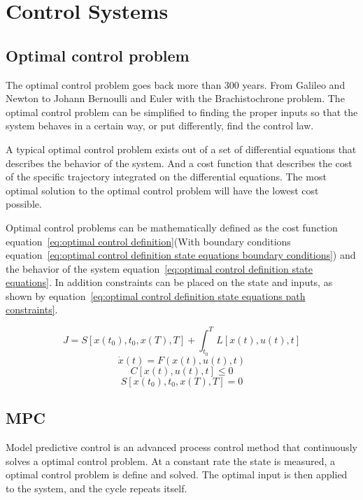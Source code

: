 \chapter{Control Systems}
\section{Optimal control problem}
	The optimal control problem goes back more than 300 years. From Galileo and Newton to Johann Bernoulli and Euler with the Brachistochrone problem. The optimal control problem can be simplified to finding the proper inputs so that the system behaves in a certain way, or put differently, find the control law.
	
	A typical optimal control problem exists out of a set of differential equations that describes the behavior of the system. And a cost function that describes the cost of the specific trajectory integrated on the differential equations. The most optimal solution to the optimal control problem will have the lowest cost possible.
	
	Optimal control problems can be mathematically defined as the cost function equation~\ref{eq:optimal control definition}(With boundary conditions equation~\ref{eq:optimal control definition state equations boundary conditions})  and the behavior of the system equation~\ref{eq:optimal control definition state equations}. In addition constraints can be placed on the state and inputs, as shown by equation~\ref{eq:optimal control definition state equations path constraints}. 
	
	\begin{equation}
		J = S[x(t_0),t_0,x(T),T] + \int_{t_0}^{T} L[x(t),u(t),t]
		\label{eq:optimal control definition}
	\end{equation}
	\begin{equation}
		\dot{x}(t) = F(x(t),u(t),t)
		\label{eq:optimal control definition state equations}
	\end{equation}
	\begin{equation}
		C[x(t),u(t),t]\le 0
		\label{eq:optimal control definition state equations path constraints}
	\end{equation}
	\begin{equation}
		S[x(t_0),t_0,x(T),T]=0
		\label{eq:optimal control definition state equations boundary conditions}
	\end{equation}

\section{MPC}
	Model predictive control is an advanced process control method that continuously solves a  optimal control problem. At a constant rate the state is measured, a optimal control problem is define and solved. The  optimal input is then applied to the system, and the cycle repeats itself.
	
